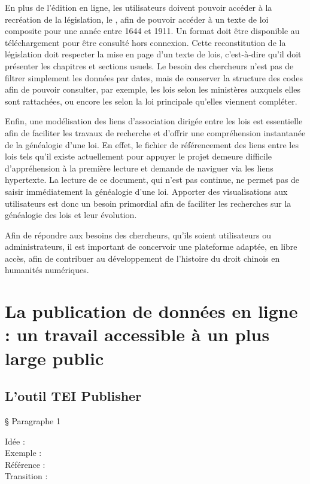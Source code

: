 En plus de l'édition en ligne, les utilisateurs doivent pouvoir accéder à la recréation de la législation, le \cv, afin de pouvoir accéder à un texte de loi composite pour une année entre 1644 et 1911. Un format \pdf doit être disponible au téléchargement pour être consulté hors connexion. Cette reconstitution de la législation doit respecter la mise en page d'un texte de lois, c'est-à-dire qu'il doit présenter les chapitres et sections usuels. Le besoin des chercheurs n'est pas de filtrer simplement les données par dates, mais de conserver la structure des codes afin de pouvoir consulter, par exemple, les lois selon les ministères auxquels elles sont rattachées, ou encore les \li selon la loi principale qu'elles viennent compléter. 

Enfin, une modélisation des liens d'association dirigée entre les lois est essentielle afin de faciliter les travaux de recherche et d'offrir une compréhension instantanée de la généalogie d'une loi. En effet, le fichier de référencement des liens entre les lois tels qu'il existe actuellement pour appuyer le projet demeure difficile d'appréhension à la première lecture et demande de naviguer via les liens hypertexte. La lecture de ce document, qui n'est pas continue, ne permet pas de saisir immédiatement la généalogie d'une loi. Apporter des visualisations aux utilisateurs est donc un besoin primordial afin de faciliter les recherches sur la généalogie des lois et leur évolution. 

Afin de répondre aux besoins des chercheurs, qu'ils soient utilisateurs ou administrateurs, il est important de concervoir une plateforme adaptée, en libre accès, afin de contribuer au développement de l'histoire du droit chinois en humanités numériques.

 \section{La publication de données en ligne : un travail accessible à un plus large public}
    \subsection{L’outil TEI Publisher}

§ Paragraphe 1

Idée :\\
Exemple :\\
Référence :\\
Transition :\\

